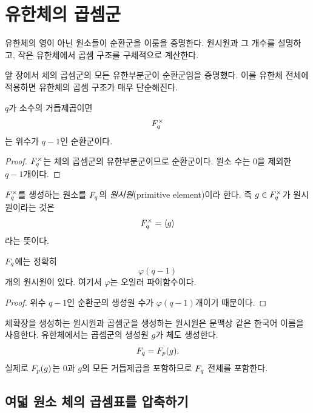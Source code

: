 \clearpage
\section{유한체의 곱셈군}
\label{sec:finite-field-multiplicative-group}

\begin{learninggoal}
유한체의 영이 아닌 원소들이 순환군을 이룸을 증명한다. 원시원과 그 개수를 설명하고, 작은 유한체에서 곱셈 구조를 구체적으로 계산한다.
\end{learninggoal}

앞 장에서 체의 곱셈군의 모든 유한부분군이 순환군임을 증명했다. 이를 유한체 전체에 적용하면 유한체의 곱셈 구조가 매우 단순해진다.

\begin{theorem}
$q$가 소수의 거듭제곱이면
\[
  F_q^\times
\]
는 위수가 $q-1$인 순환군이다.
\end{theorem}

\begin{proof}
$F_q^\times$는 체의 곱셈군의 유한부분군이므로 순환군이다. 원소 수는 $0$을 제외한 $q-1$개이다.
\end{proof}

\begin{definition}[원시원]
$F_q^\times$를 생성하는 원소를 $F_q$의 \emph{원시원}(primitive element)이라 한다. 즉 $g\in F_q^\times$가 원시원이라는 것은
\[
  F_q^\times=\langle g\rangle
\]
라는 뜻이다.
\end{definition}

\begin{corollary}
$F_q$에는 정확히
\[
  \varphi(q-1)
\]
개의 원시원이 있다. 여기서 $\varphi$는 오일러 파이함수이다.
\end{corollary}

\begin{proof}
위수 $q-1$인 순환군의 생성원 수가 $\varphi(q-1)$개이기 때문이다.
\end{proof}

\begin{remark}
체확장을 생성하는 원시원과 곱셈군을 생성하는 원시원은 문맥상 같은 한국어 이름을 사용한다. 유한체에서는 곱셈군의 생성원 $g$가 체도 생성한다.
\[
  F_q=F_p(g).
\]
실제로 $F_p(g)$는 $0$과 $g$의 모든 거듭제곱을 포함하므로 $F_q$ 전체를 포함한다.
\end{remark}

\subsection{여덟 원소 체의 곱셈표를 압축하기}

